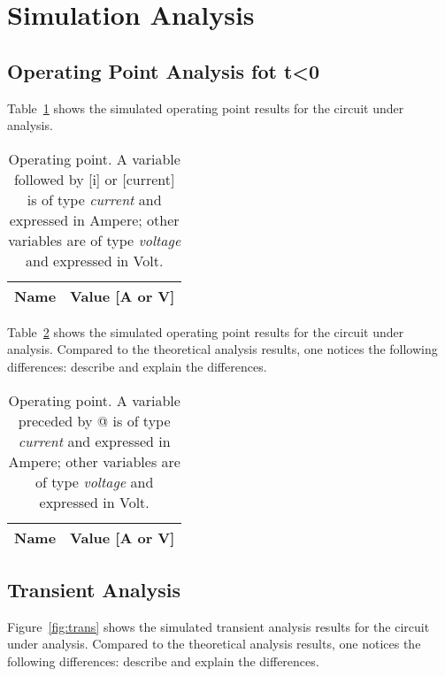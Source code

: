 \section{Simulation Analysis}
\label{sec:simulation}

\subsection{Operating Point Analysis fot t<0}

\par Table~\ref{tab:op_tb0} shows the simulated operating point results for the circuit
under analysis.
\begin{table}[H]
  \centering
  \begin{tabular}{|l|r|}
    \hline    
    {\bf Name} & {\bf Value [A or V]} \\ \hline
    
  \end{tabular}
  \caption{Operating point. A variable followed by [i] or [current] is of type {\em current}
    and expressed in Ampere; other variables are of type {\it voltage} and expressed in
    Volt.}
  \label{tab:op_tb0}
\end{table}







Table~\ref{tab:op} shows the simulated operating point results for the circuit
under analysis. Compared to the theoretical analysis results, one notices the
following differences: describe and explain the differences.

\begin{table}[h]
  \centering
  \begin{tabular}{|l|r|}
    \hline    
    {\bf Name} & {\bf Value [A or V]} \\ \hline
    
  \end{tabular}
  \caption{Operating point. A variable preceded by @ is of type {\em current}
    and expressed in Ampere; other variables are of type {\it voltage} and expressed in
    Volt.}
  \label{tab:op}
\end{table}

\lipsum[1-1]


\subsection{Transient Analysis}

Figure~\ref{fig:trans} shows the simulated transient analysis results for the
circuit under analysis. Compared to the theoretical analysis results, one
notices the following differences: describe and explain the differences.

